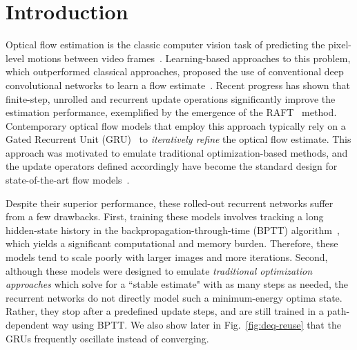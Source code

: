 \documentclass[10pt,twocolumn,letterpaper]{article}
\newcommand{\emptybox}[2][\textwidth]{\begingroup
  \setlength{\fboxsep}{-\fboxrule}\noindent\framebox[#1]{\rule{0pt}{#2}}\endgroup
}
\begin{document}
\begin{comment}
\begin{figure*}[t]
\emptybox[18cm]{3cm}
\caption{Splash figure 1. See \url{https://arxiv.org/pdf/2104.02409.pdf} for example.}
\vspace{-.3cm}
\end{figure*}
\end{comment}

\section{Introduction}
\label{sec:intro}
Optical flow estimation is the classic computer vision task of predicting the pixel-level motions between video frames~\cite{lucas1981iterative,horn1981determining,flownet,maskflownet,RAFT}. Learning-based approaches to this problem, which outperformed classical approaches, proposed the use of conventional deep convolutional networks to learn a flow estimate~\cite{flownet,liteflownet2,maskflownet}.
Recent progress has shown that finite-step, unrolled and recurrent update operations significantly improve the estimation performance, exemplified by the emergence of the RAFT~\cite{RAFT} method. Contemporary optical flow models that employ this approach typically rely on a Gated Recurrent Unit (GRU)~\cite{GRU} to \emph{iteratively refine} the optical flow estimate. 
This approach was motivated to emulate traditional optimization-based methods, and the update operators defined accordingly have become the standard design for state-of-the-art flow models~\cite{RAFT,autoflow,GMA,eldesokey2021normalized,Jiang2021LearningOF}.

Despite their superior performance, these rolled-out recurrent networks suffer from a few drawbacks.
First, training these models involves tracking a long hidden-state history in the backpropagation-through-time (BPTT) algorithm~\cite{werbos1990backpropagation}, which yields a significant computational and memory burden. Therefore, these models tend to scale poorly with larger images and more iterations. 
Second, although these models were designed to emulate \emph{traditional optimization approaches} which solve for a ``stable estimate" with as many steps as needed, the recurrent networks do not directly model such a minimum-energy optima state. Rather, they stop after a predefined  update steps, and are still trained in a path-dependent way using BPTT. We also show later in Fig.~\ref{fig:deq-reuse} that the GRUs frequently oscillate instead of converging.
\end{document}

